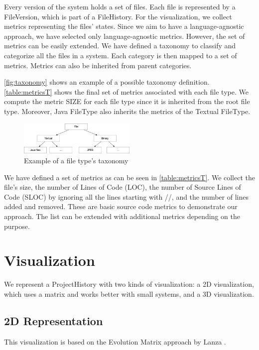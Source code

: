 Every version of the system holds a set of files. 
Each file is represented by a FileVersion, which is part of a FileHistory.
For the visualization, we collect metrics representing the files' states.
Since we aim to have a language-agnostic approach, we have selected only language-agnostic metrics. 
However, the set of metrics can be easily extended.
We have defined a taxonomy to classify and categorize all the files in a system. 
Each category is then mapped to a set of metrics. Metrics can also be inherited from parent categories. 

\autoref{fig:taxonomy} shows an example of a possible taxonomy definition. \autoref{table:metricsT} shows the final set of metrics associated with each file type. We compute the metric SIZE for each file type since it is inherited from the root file type. Moreover, Java FileType also inherits the metrics of the Textual FileType.  

\begin{figure}[ht]
    \centering
    \includegraphics[width=0.5\textwidth]{Taxonomy.jpg}
    \caption{Example of a file type's taxonomy}
    \label{fig:taxonomy}
\end{figure}



We have defined a set of metrics as can be seen in \autoref{table:metricsT}. We collect the file's size, the number of Lines of Code (LOC), the number of Source Lines of Code (SLOC) by ignoring all the lines starting with //, and the number of lines added and removed. These are basic source code metrics to demonstrate our approach. The list can be extended with additional metrics depending on the purpose.


\section{Visualization}
We represent a ProjectHistory with two kinds of visualization: a 2D visualization, which uses a matrix and works better with small systems, and a 3D visualization. 


\subsection{2D Representation}
This visualization is based on the Evolution Matrix approach by Lanza \cite{Lanza2001}. 

